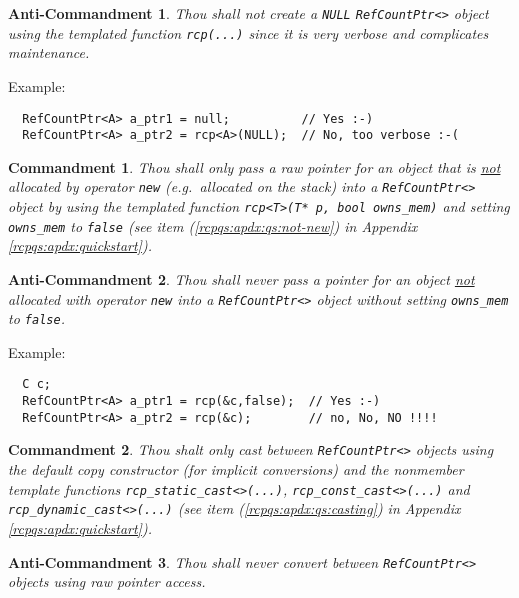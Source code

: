 \documentclass[pdf,ps2pdf,11pt]{SANDreport}
\newtheorem{commandment}{Commandment}
\newtheorem{anticommandment}{Anti-Commandment}
\begin{document}
\begin{anticommandment}
Thou shall not create a {}\texttt{NULL} {}\texttt{Ref\-Count\-Ptr<>}
object using the templated function {}\texttt{rcp(...)} since it is
very verbose and complicates maintenance.
\end{anticommandment}

{}\noindent{}Example:
{\small\begin{verbatim}
  RefCountPtr<A> a_ptr1 = null;          // Yes :-)
  RefCountPtr<A> a_ptr2 = rcp<A>(NULL);  // No, too verbose :-(
\end{verbatim}}

\begin{commandment}
Thou shall only pass a raw pointer for an object that is
{}\underline{not} allocated by operator {}\texttt{new} (e.g.~allocated
on the stack) into a {}\texttt{Ref\-Count\-Ptr<>} object by using the
templated function {}\texttt{rcp<T>(T* p, bool owns\_mem)} and setting
{}\texttt{owns\_mem} to {}\texttt{false} (see item
({}\ref{rcpqs:apdx:qs:not-new}) in Appendix
{}\ref{rcpqs:apdx:quickstart}).
\end{commandment}

\begin{anticommandment}
Thou shall never pass a pointer for an object {}\underline{not}
allocated with operator {}\texttt{new} into a
{}\texttt{Ref\-Count\-Ptr<>} object without setting
{}\texttt{owns\_mem} to {}\texttt{false}.
\end{anticommandment}

{}\noindent{}Example:
{\small\begin{verbatim}
  C c;
  RefCountPtr<A> a_ptr1 = rcp(&c,false);  // Yes :-)
  RefCountPtr<A> a_ptr2 = rcp(&c);        // no, No, NO !!!!
\end{verbatim}}

\begin{commandment}\label{rcp:cmnd:converstion}
Thou shalt only cast between {}\texttt{Ref\-Count\-Ptr<>} objects
using the default copy constructor (for implicit conversions) and the
nonmember template functions
{}\texttt{rcp\-\_static\-\_cast<>(\-...)},
{}\texttt{rcp\-\_const\-\_cast<>(\-...)} and
{}\texttt{rcp\-\_dynamic\-\_cast<>(\-...)}  (see item
({}\ref{rcpqs:apdx:qs:casting}) in Appendix
{}\ref{rcpqs:apdx:quickstart}).
\end{commandment}

\begin{anticommandment}
Thou shall never convert between {}\texttt{Ref\-Count\-Ptr<>} objects
using raw pointer access.
\end{anticommandment}
\end{document}
